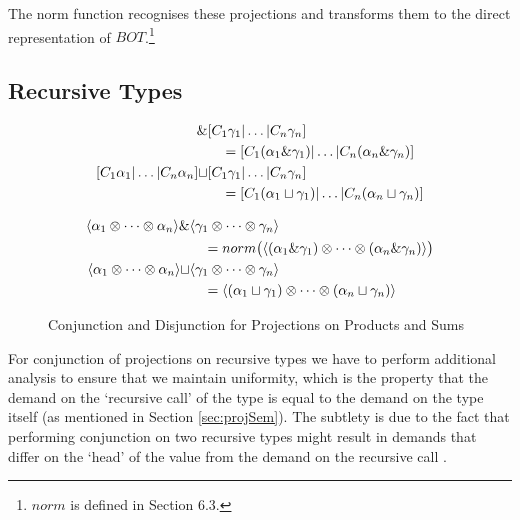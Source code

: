 The \<norm\> function recognises these projections and transforms them to the
direct representation of $BOT$.\footnote{$norm$ is defined in
\cite{hinze1995projection} Section 6.3.}

\subsection{Recursive Types}

\begin{figure}
\noindent

\begin{align*}
[C_{1} \alpha_{1} | \dots | C_{n} \alpha_{n}] \pmeet& [C_{1} \gamma_{1} | \dots | C_{n} \gamma_{n}] \\
    & \quad = [C_{1} (\alpha_{1} \pmeet \gamma_{1}) | \dots | C_{n} (\alpha_{n} \pmeet \gamma_{n})] \\
[C_{1} \alpha_{1} | \dots | C_{n} \alpha_{n}] \sqcup& [C_{1} \gamma_{1} | \dots | C_{n} \gamma_{n}] \\
    & \quad = [C_{1} (\alpha_{1} \sqcup \gamma_{1}) | \dots | C_{n} (\alpha_{n} \sqcup \gamma_{n})]
\end{align*}%

\begin{align*}
\langle \alpha_{1} \otimes \dots \otimes \alpha_{n} \rangle \&& \langle \gamma_{1} \otimes \dots \otimes \gamma_{n} \rangle \\
    & \quad = norm \big( \langle (\alpha_{1} \& \gamma_{1}) \otimes \dots \otimes (\alpha_{n} \& \gamma_{n})\rangle \big) \\
\langle \alpha_{1} \otimes \dots \otimes \alpha_{n} \rangle \sqcup& \langle \gamma_{1} \otimes \dots \otimes \gamma_{n} \rangle \\
    & \quad = \langle (\alpha_{1} \sqcup \gamma_{1}) \otimes \dots \otimes (\alpha_{n} \sqcup \gamma_{n})\rangle
\end{align*}
\caption[Conjunction and Disjunction for Projections 2]{Conjunction and Disjunction for Projections on Products and Sums}
\label{fig:conjDisSum}
\end{figure}

For conjunction of projections on recursive types we have to perform additional
analysis to ensure that we maintain uniformity, which is the property that the
demand on the `recursive call' of the type is equal to the demand on the type
itself (as mentioned in Section \ref{sec:projSem}). The subtlety is due to the
fact that performing conjunction on two recursive types might result in demands
that differ on the `head' of the value from the demand on the recursive call
\citep{kubiak, hinze1995projection}.

